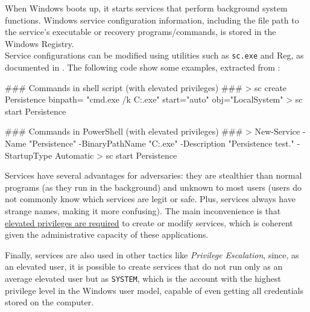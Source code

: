 \begin{itemize}
When Windows boots up, it starts services that perform background system functions. Windows service configuration information, including the file path to the service's executable or recovery programs/commands, is stored in the Windows Registry.\\
Service configurations can be modified using utilities such as \texttt{sc.exe} and Reg, as documented in \cite{Mitre}. The following code show some examples, extracted from \cite{PayloadAllTheThings}:
\begin{spverbatim}
### Commands in shell script (with elevated privileges) ###
> sc create Persistence binpath= "cmd.exe /k C:\Temp\persistence.exe" start="auto" obj="LocalSystem"
> sc start Persistence

### Commands in PowerShell (with elevated privileges) ###
> New-Service -Name "Persistence" -BinaryPathName "C:\Windows\Temp\persistence.exe" -Description "Persistence test." -StartupType Automatic
> sc start Persistence
\end{spverbatim}

Services have several advantages for adversaries: they are stealthier than normal programs (as they run in the background) and unknown to most users (users do not commonly know which services are legit or safe. Plus, services always have strange names, making it more confusing). The main inconvenience is that \underline{elevated privileges are required} to create or modify services, which is coherent given the administrative capacity of these applications.

Finally, services are also used in other tactics like \textit{Privilege Escalation}, since, as an elevated user, it is possible to create services that do not run only as an average elevated user but as \texttt{SYSTEM}, which is the account with the highest privilege level in the Windows user model, capable of even getting all credentials stored on the computer. 
\end{itemize}


